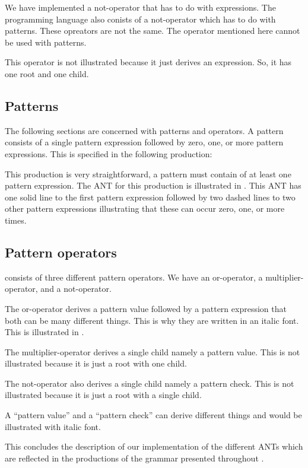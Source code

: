 We have implemented a not-operator that has to do with expressions. The programming
language also conists of a not-operator which has to do with patterns. These
opreators are not the same. The operator mentioned here cannot be used with
patterns. 

This operator is not illustrated because it just derives an expression. So, it 
has one root and one child.

\subsection{Patterns}

The following sections are concerned with patterns and operators. A pattern
consists of a single pattern expression followed by zero, one, or more pattern
expressions.  This is specified in the following production:

\begin{ebnf}
\end{ebnf}

This production is very straightforward, a pattern must contain of at least one
pattern expression. The ANT for this production is illustrated in
. This ANT has one solid line to the first pattern
expression followed by two dashed lines to two other pattern expressions
illustrating that these can occur zero, one, or more times.



\subsection{Pattern operators}

\productname{} consists of three different pattern operators. We have an
or-operator, a multiplier-operator, and a not-operator.

The or-operator derives a pattern value followed by a pattern expression that
both can be many different things. This is why they are written in an italic
font. This is illustrated in .



The multiplier-operator derives a single child namely a pattern value. This is
not illustrated because it is just a root with one child.

The not-operator also derives a single child namely a pattern check. This is not
illustrated because it is just a root with a single child.

A ``pattern value'' and a ``pattern check'' can derive different things and
would be illustrated with italic font.

This concludes the description of our implementation of the different ANTs which 
are reflected in the productions of the grammar presented throughout
.

